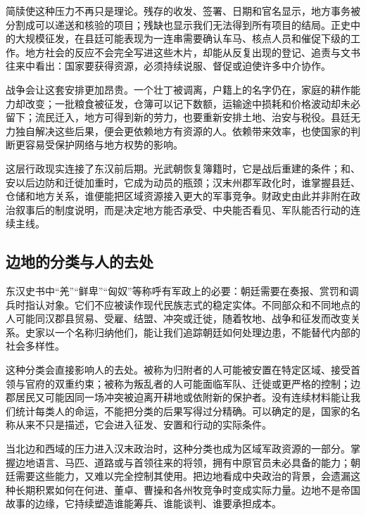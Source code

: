 简牍使这种压力不再只是理论。残存的收发、签署、日期和官名显示，地方事务被分割成可以递送和核验的项目；残缺也显示我们无法得到所有项目的结局。正史中的大规模征发，在县廷可能表现为一连串需要确认车马、核点人员和催促下级的工作。地方社会的反应不会完全写进这些木片，却能从反复出现的登记、追责与文书往来中看出：国家要获得资源，必须持续说服、督促或迫使许多中介协作。

战争会让这套安排更加昂贵。一个壮丁被调离，户籍上的名字仍在，家庭的耕作能力却改变；一批粮食被征发，仓簿可以记下数额，运输途中损耗和价格波动却未必留下；流民迁入，地方可得到新的劳力，也要重新安排土地、治安与税役。县廷无力独自解决这些后果，便会更依赖地方有资源的人。依赖带来效率，也使国家的判断更容易受保护网络与地方权势的影响。

这层行政现实连接了东汉前后期。光武朝恢复簿籍时，它是战后重建的条件；和、安以后边防和迁徙加重时，它成为动员的瓶颈；汉末州郡军政化时，谁掌握县廷、仓储和地方关系，谁便能把区域资源接入更大的军事竞争。财政史由此并非附在政治叙事后的制度说明，而是决定地方能否承受、中央能否看见、军队能否行动的连续主线。

\subsection{边地的分类与人的去处}

东汉史书中“羌”“鲜卑”“匈奴”等称呼有军政上的必要：朝廷需要在奏报、赏罚和调兵时指认对象。它们不应被读作现代民族志式的稳定实体。不同部众和不同地点的人可能同汉郡县贸易、受雇、结盟、冲突或迁徙，随着牧地、战争和征发而改变关系。史家以一个名称归纳他们，能让我们追踪朝廷如何处理边患，不能替代内部的社会多样性。

这种分类会直接影响人的去处。被称为归附者的人可能被安置在特定区域、接受首领与官府的双重约束；被称为叛乱者的人可能面临军队、迁徙或更严格的控制；边郡居民又可能因同一场冲突被迫离开耕地或依附新的保护者。没有连续材料能让我们统计每类人的命运，不能把分类的后果写得过分精确。可以确定的是，国家的名称从来不只是描述，它会进入征发、安置和行动的实际条件。

当北边和西域的压力进入汉末政治时，这种分类也成为区域军政资源的一部分。掌握边地语言、马匹、道路或与首领往来的将领，拥有中原官员未必具备的能力；朝廷需要这些能力，又难以完全控制其使用。把边地看成中央政治的背景，会遗漏这种长期积累如何在何进、董卓、曹操和各州牧竞争时变成实际力量。边地不是帝国故事的边缘，它持续塑造谁能筹兵、谁能谈判、谁要承担成本。
